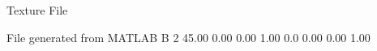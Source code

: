 Texture File

File generated from MATLAB
B 2
   45.00   0.00   0.00  1.00
   0.0   0.00   0.00  1.00
